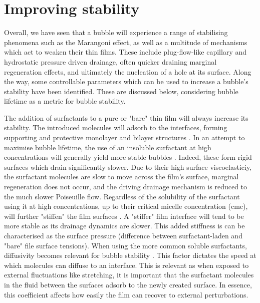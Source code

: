 \documentclass[a4paper,12pt]{article}
\numberwithin{equation}{section}
\numberwithin{figure}{section}
\numberwithin{table}{section}
\begin{document}
\section{Improving stability}
Overall, we have seen that a bubble will experience a range of stabilising phenomena such as the Marangoni effect, as well as a multitude of mechanisms which act to weaken their thin films. These include plug-flow-like capillary and hydrostatic pressure driven drainage, often quicker draining marginal regeneration effects, and ultimately the nucleation of a hole at its surface. Along the way, some controllable parameters which can be used to increase a bubble's stability have been identified. These are discussed below, considering bubble lifetime as a metric for bubble stability.

The addition of surfactants to a pure or "bare" thin film will always increase its stability. The introduced molecules will adsorb to the interfaces, forming supporting and protective monolayer and bilayer structures \cite{Gast1997, Mysels1968Nomenclature}. In an attempt to maximise bubble lifetime, the use of an insoluble surfactant at high concentrations will generally yield more stable bubbles \cite{Petit2015, ChampougnyNotBare2016, Bhamla2017}. Indeed, these form rigid surfaces which drain significantly slower. Due to their high surface viscoelasticiy, the surfactant molecules are slow to move across the film's surface, marginal regeneration does not occur, and the driving drainage mechanism is reduced to the much slower Poiseuille flow. Regardless of the solubility of the surfactant using it at high concentrations, up to their critical micelle concentration (cmc), will further "stiffen" the film surfaces \cite{Bhamla2017}. A "stiffer" film interface will tend to be more stable as its drainage dynamics are slower. This added stiffness is can be characterised as the surface pressure (difference between surfactant-laden and "bare" file surface tensions). When using the more common soluble surfactants, diffusivity becomes relevant for bubble stability \cite{deGennesYoung2001}. This factor dictates the speed at which molecules can diffuse to an interface. This is relevant as when exposed to external fluctuations like stretching, it is important that the surfactant molecules in the fluid between the surfaces adsorb to the newly created surface. In essence, this coefficient affects how easily the film can recover to external perturbations.
\end{document}
